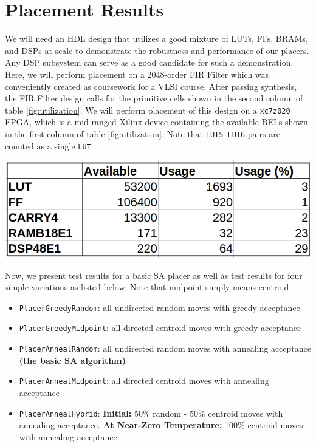 \section{Placement Results}
\label{sec:results}


We will need an HDL design that utilizes a good mixture of LUTs, FFs, BRAMs, and DSPs at scale to demonstrate the robustness and performance of our placers. 
Any DSP subsystem can serve as a good candidate for such a demonstration. 
Here, we will perform placement on a 2048-order FIR Filter which was conveniently created as coursework for a VLSI course. 
After passing synthesis, the FIR Filter design calls for the primitive cells shown in the second column of table \ref{fig:utilization}.
We will perform placement of this design on a \texttt{xc7z020} FPGA, which is a mid-ranged Xilinx device containing the available BELs shown in the first column of table \ref{fig:utilization}.
Note that \texttt{LUT5-LUT6} pairs are counted as a single \texttt{LUT}.

\vspace{0.25cm}
{
    \centering
    \includegraphics[width=0.8\columnwidth]{figures/results/utilization.png}
    \label{fig:utilization}
}
\vspace{0.25cm}

Now, we present test results for a basic SA placer as well as test results for four simple variations as listed below. 
Note that midpoint simply means centroid.

\begin{itemize}
    \item \texttt{PlacerGreedyRandom}: all undirected random moves with greedy acceptance
    \item \texttt{PlacerGreedyMidpoint}: all directed centroid moves with greedy acceptance
    \item \texttt{PlacerAnnealRandom}: all undirected random moves with annealing acceptance \textbf{(the basic SA algorithm)}
    \item \texttt{PlacerAnnealMidpoint}: all directed centroid moves with annealing acceptance
    \item \texttt{PlacerAnnealHybrid}: \textbf{Initial:} 50\% random - 50\% centroid moves with annealing acceptance. \textbf{At Near-Zero Temperature:} 100\% centroid moves with annealing acceptance.
\end{itemize}

